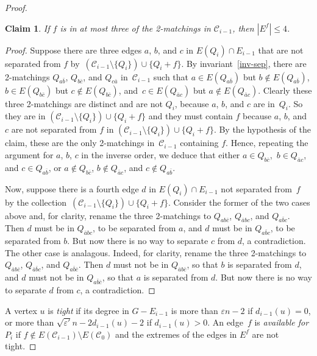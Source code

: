 \documentclass[a4paper, 11pt,reqno]{amsart}
\newcommand{\calC}{\mathcal{C}}
\theoremstyle{plain}
\newtheorem{claim}[theorem]{Claim}
\theoremstyle{definition}
\numberwithin{equation}{section}
\newcommand{\eps}{\varepsilon}
\begin{document}
\begin{proof}
\begin{claim}\label{clm:atmost3}
	If $f$ is in at most three of the 2-matchings in $\calC_{i-1}$, then $|E^f| \leq 4$.
\end{claim}

\begin{proof}
	Suppose there are three edges $a$, $b$, and $c$ in $E(Q_i) \cap E_{i-1}$ 
	that are not separated from $f$ by~$(\calC_{i-1} \setminus \{Q_i\}) \cup \{Q_i+f\}$. 
	By invariant~\ref{inv-sep}, there are 2-matchings $Q_{a\bar{b}}$, $Q_{b\bar{c}}$, and $Q_{c\bar{a}}$ 
	in~$\calC_{i-1}$ such that $a \in E(Q_{a\bar{b}})$ but $b \not\in E(Q_{a\bar{b}})$, $b \in E(Q_{b\bar{c}})$ 
	but $c \not\in E(Q_{b\bar{c}})$, and~$c \in E(Q_{\bar{a}c})$ but $a \not\in E(Q_{\bar{a}c})$. 
	Clearly these three 2-matchings are distinct and are not $Q_i$, because $a$, $b$, and $c$ are in~$Q_i$. 
	So they are in $(\calC_{i-1} \setminus \{Q_i\}) \cup \{Q_i+f\}$ and they must contain $f$
	because $a$, $b$, and $c$ are not separated from $f$ in $(\calC_{i-1} \setminus \{Q_i\}) \cup \{Q_i+f\}$. 
	By the hypothesis of the claim, these are the only 2-matchings in~$\calC_{i-1}$ containing $f$. 
	Hence, repeating the argument for $a$, $b$, $c$ in the inverse order, 
	we deduce that either $a \in Q_{b\bar{c}}$,~$b \in Q_{\bar{a}c}$, and $c \in Q_{a\bar{b}}$, 
	or $a \not\in Q_{b\bar{c}}$, $b \not\in Q_{\bar{a}c}$, and $c \not\in Q_{a\bar{b}}$.
	
	Now, suppose there is a fourth edge $d$ in $E(Q_i) \cap E_{i-1}$ not 
	separated from~$f$ by the collection~$(\calC_{i-1} \setminus \{Q_i\}) \cup \{Q_i+f\}$. 
	Consider the former of the two cases above and, for clarity, rename the 
	three 2-matchings to $Q_{ab\bar{c}}$, $Q_{\bar{a}bc}$, and $Q_{a\bar{b}c}$. 
	Then $d$ must be in $Q_{\bar{a}bc}$, to be separated from $a$, 
	and $d$ must be in $Q_{a\bar{b}c}$, to be separated from $b$. 
	But now there is no way to separate $c$ from $d$, a contradiction. 
	The other case is analagous.  Indeed, for clarity, rename the three 2-matchings 
	to $Q_{\bar{a}b\bar{c}}$, $Q_{\bar{a}\bar{b}c}$, and $Q_{a\bar{b}\bar{c}}$. 
	Then $d$ must not be in $Q_{\bar{a}b\bar{c}}$, so that $b$ is separated from $d$, 
	and $d$ must not be in $Q_{a\bar{b}\bar{c}}$, so that $a$ is separated from $d$. 
	But now there is no way to separate $d$ from $c$, a contradiction.
\end{proof}
  
  A vertex $u$ is \emph{tight} if its degree in $G-E_{i-1}$ is more than $\eps n - 2$ 
  if $d_{i-1}(u) = 0$, or more than $\sqrt{\eps'}n - 2d_{i-1}(u) - 2$ if $d_{i-1}(u) > 0$.
  An edge~$f$ is \emph{available for $P_i$} if $f \not\in E(\calC_{i-1}) \setminus E(\calC_0)$
  and the extremes of the edges in $E^f$ are not tight.
  

\end{proof}
\end{document}
